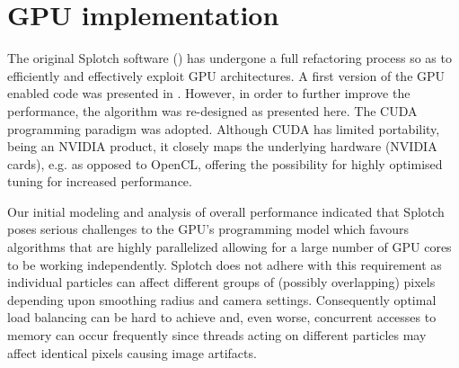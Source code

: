 \section{GPU implementation}

The original Splotch software (\citet{2008NJPh...10l5006D}) has undergone a full refactoring process so as to
efficiently and effectively exploit GPU architectures. A first version of the GPU enabled code was presented in 
\citet{jin:high-performance}. However, in order to further improve the performance, the 
algorithm was re-designed as presented here. 
The CUDA programming paradigm was adopted. Although CUDA has limited portability, being an NVIDIA product, it closely maps the underlying hardware (NVIDIA cards), e.g. as opposed to OpenCL, offering the possibility for highly optimised tuning for increased performance.

Our initial modeling and analysis of overall performance indicated that
Splotch poses serious challenges
to the GPU's programming model which favours algorithms that are highly parallelized allowing for a large number of 
GPU cores to be working independently. Splotch does not adhere with this requirement as individual particles can affect different groups of (possibly overlapping) pixels depending upon smoothing radius and camera settings. Consequently optimal load balancing can be hard to achieve
and, even worse, concurrent accesses to memory can occur frequently since threads acting on different particles may
affect identical pixels causing image artifacts.

